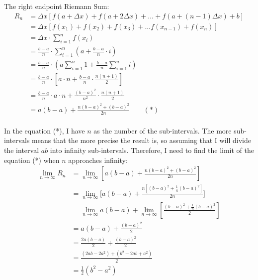 \documentclass[12pt]{article}
\begin{document}
\noindent The right endpoint Riemann Sum:
\begin{align*}
    R_n
    &= \Delta x\left[f\left(a+\Delta x\right)+ f\left(a+2\Delta x\right)
    +\dots+ f\left(a+\left(n-1\right)\Delta x\right)+b \right]\\
    &= \Delta x\left[f\left(x_1\right)+ f\left(x_2\right)+ f\left(x_3\right)+\dots f\left(x_{n-1}\right)+ f\left(x_n\right) \right] \\
    &=\Delta x\cdot\sum_{i=1}^{n}f\left(x_i\right)\\
    &=\frac{b-a}{n}\cdot\sum_{i=1}^{n}\left(a +\frac{b-a}{n}\cdot i \right)\\
    &=\frac{b-a}{n}\cdot\left(a\sum_{i=1}^{n}1+\frac{b-a}{n}\sum_{i=1}^{n}i\right)\\
    &=\frac{b-a}{n}\cdot\left[a \cdot n+ \frac{b-a}{n}\cdot \frac{n\left(n+1\right)}{2} \right]\\
    &=\frac{b-a}{n}\cdot a\cdot n+ \frac{\left(b-a\right)^2}{n^2}\cdot \frac{n\left(n+1\right)}{2} \\
    &=a\left(b-a \right)+ \frac{n\left(b-a\right)^2+\left(b-a\right)^2}{2n} \qquad (*)\\
\end{align*}

\noindent In the equation (*), I have $n$ as the number of the sub-intervals. The more sub-intervals means that the more precise the result is, so assuming that I will divide the interval $ab$ into infinity sub-intervals. Therefore, I need to find the limit of the equation (*) when $n$ approaches infinity:
\begin{align*}
    \lim_{n\to\infty}R_n &=\lim_{n\to\infty}\left[a\left(b-a \right)+ \frac{n\left(b-a\right)^2+\left(b-a\right)^2}{2n}\right]\\
    &=\lim_{n\to\infty} \Bigg[ a\left(b-a \right)+ \frac{n \left[ \left( b-a\right)^2+ \frac{1}{n} \left(b-a\right)^2 \right]}{2n} \Bigg]\\
    &=\lim_{n\to\infty} a\left(b-a \right)+ \lim_{n\to\infty}\left[ \frac{ \left( b-a\right)^2+ \frac{1}{n} \left(b-a\right)^2}{2}\right] \\
    &=a\left(b-a \right)+ \frac{ \left( b-a\right)^2}{2} \\
    &=\frac{2a\left(b-a \right)}{2}+ \frac{ \left( b-a\right)^2}{2} \\
    &=\frac{\left(2ab-2a^2 \right)+ \left(b^2-2ab+a^2 \right)}{2} \\
    &=\frac{1}{2} \left(b^2-a^2 \right) \\
\end{align*} \par
\end{document}
